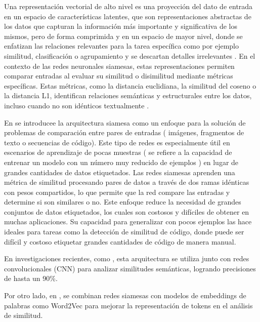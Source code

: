 Una representación vectorial de alto nivel es una proyección del dato de entrada en un espacio de características latentes, que son representaciones abstractas de los datos que capturan la información más importante y significativa de los mismos, pero de forma comprimida y en un espacio de mayor nivel, donde se enfatizan las relaciones relevantes para la tarea específica como por ejemplo similitud, clasificación o agrupamiento y se descartan detalles irrelevantes \cite{mikolov2013efficient}. En el contexto de las redes neuronales siamesas, estas representaciones permiten comparar entradas al evaluar su similitud o disimilitud mediante métricas específicas. Estas métricas, como la distancia euclidiana\cite{cortes1995support}, la similitud del coseno\cite{manning2008introduction} o la distancia L1\cite{bishop2006pattern}, identifican relaciones semánticas y estructurales entre los datos, incluso cuando no son idénticos textualmente \cite{chopra2005learning, bromley1993signature}.

En \cite{koch2015siamese} se introducee la arquitectura siamesa como un enfoque para la solución de problemas de comparación entre pares de entradas ( imágenes, fragmentos de texto o secuencias de código). Este tipo de redes es especialmente útil en escenarios de aprendizaje de pocas muestras ( se refiere a la capacidad de entrenar un modelo con un número muy reducido de ejemplos ) en lugar de grandes cantidades de datos etiquetados. Las redes siamesas aprenden una métrica de similitud procesando pares de datos a través de dos ramas idénticas con pesos compartidos, lo que permite que la red compare las entradas y determine si son similares o no. Este enfoque reduce la necesidad de grandes conjuntos de datos etiquetados, los cuales son costosos y difíciles de obtener en muchas aplicaciones\cite{koch2015siamese}. Su capacidad para generalizar con pocos ejemplos las hace ideales para tareas como la detección de similitud de código, donde puede ser difícil y costoso etiquetar grandes cantidades de código de manera manual.

En investigaciones recientes, como \cite{ijana2022semantic}, esta arquitectura se utiliza junto con redes convolucionales (CNN)\cite{krizhevsky2012imagenet} para analizar similitudes semánticas, logrando precisiones de hasta un 90\%.

Por otro lado, en \cite{Li2022}, se combinan redes siamesas con modelos de embeddings de palabras como Word2Vec para mejorar la representación de tokens en el análisis de similitud.



